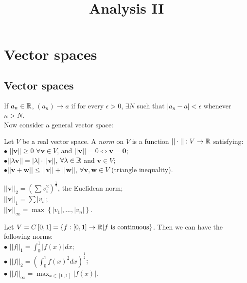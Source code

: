 \documentclass[a4paper]{article}
\begin{document}
\title{Analysis II}

\maketitle

\newpage

\tableofcontents

\newpage

\section{Vector spaces}

\subsection{Vector spaces}
If $a_n\in \mathbb{R}$, $\left(a_n\right)\to a$ if for every $\epsilon > 0$, $\exists N$ such that $|a_n-a|<\epsilon$ whenever $n>N$.\\
Now consider a general vector space:
\begin{defi}
Let $V$ be a real vector space. A \emph{norm} on $V$ is a function $||\cdot ||:V\to \mathbb{R}$ satisfying:\\
$\bullet$ $||\mathbf{v}|| \geq 0$ $\forall \mathbf{v} \in V$, and $||\mathbf{v}|| = 0 \iff \mathbf{v} = \mathbf{0}$;\\
$\bullet ||\lambda \mathbf{v}|| = |\lambda| \cdot ||\mathbf{v}||$, $\forall \lambda \in \mathbb{R}$ and $\mathbf{v} \in V$;\\
$\bullet ||\mathbf{v}+\mathbf{w}|| \leq ||\mathbf{v}|| + ||\mathbf{w}||$, $\forall \mathbf{v},\mathbf{w}\in V$ (triangle inequality).
\end{defi}

\begin{eg}
$||\mathbf{v}||_2 = \left(\sum v_i^2\right)^\frac{1}{2}$, the Euclidean norm;\\
$||\mathbf{v}||_1 = \sum |v_i|$;\\
$||\mathbf{v}||_\infty = \max\left\{|v_1|,...,|v_n|\right\}$.
\end{eg}

\begin{eg}
Let $V=C\left[0,1\right] = \left\{ f:\left[0,1\right]\to\mathbb{R} | f\text{ is continuous}\right\}$. Then we can have the following norms:\\
$\bullet$ $||f||_1 = \int_0^1 |f\left(x\right)| dx$;\\
$\bullet$ $||f||_2 = \left(\int_0^1 f\left(x\right)^2 dx\right)^\frac{1}{2}$;\\
$\bullet$ $||f||_\infty = \max_{x\in\left[0,1\right]} |f\left(x\right)|$.
\end{eg}
\end{document}
